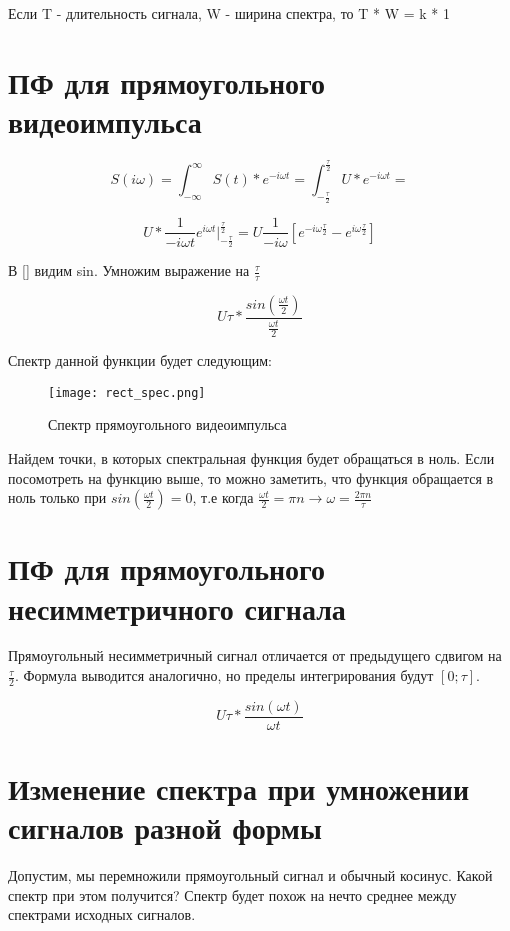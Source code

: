 Если T - длительность сигнала, W - ширина спектра, то T * W = k * 1

\section*{\textbf{ПФ для прямоугольного видеоимпульса}}

$$S(i\omega) = \int_{-\infty}^{\infty}S(t)*e^{-i\omega t} = \int_{-\frac{\tau}{2}}^{\frac{\tau}{2}}U*e^{-i\omega t} = $$

$$U * \frac{1}{-i\omega t}e^{i\omega t}\bigg|_{-\frac{\tau}{2}}^{\frac{\tau}{2}} = U\frac{1}{-i\omega}[e^{-i\omega\frac{\tau}{2}} - e^{i\omega\frac{\tau}{2}}]$$

В [] видим sin. Умножим выражение на $\frac{\tau}{\tau}$

$$\boxed{U\tau * \frac{sin(\frac{\omega t}{2})}{\frac{\omega t}{2}}}$$

Спектр данной функции будет следующим:

\begin{figure}[H]
    \centering
    \texttt{[image: rect\_spec.png]}
    \caption{Спектр прямоугольного видеоимпульса}
\end{figure}

Найдем точки, в которых спектральная функция будет обращаться в ноль. Если посомотреть на функцию выше, то можно заметить, что функция
обращается в ноль только при $sin(\frac{\omega t}{2}) = 0$, т.е когда $\frac{\omega t}{2} = \pi n \to \omega = \frac{2\pi n}{\tau}$


\section*{\textbf{ПФ для прямоугольного несимметричного сигнала}}

Прямоугольный несимметричный сигнал отличается от предыдущего сдвигом на $\frac{\tau}{2}$. Формула выводится аналогично, но 
пределы интегрирования будут $[0;\tau]$.

$$\boxed{U\tau * \frac{sin(\omega t)}{\omega t}}$$

\section*{\textbf{Изменение спектра при умножении сигналов разной формы}}

Допустим, мы перемножили прямоугольный сигнал и обычный косинус. Какой спектр при этом получится? Спектр будет похож на нечто
среднее между спектрами исходных сигналов.


